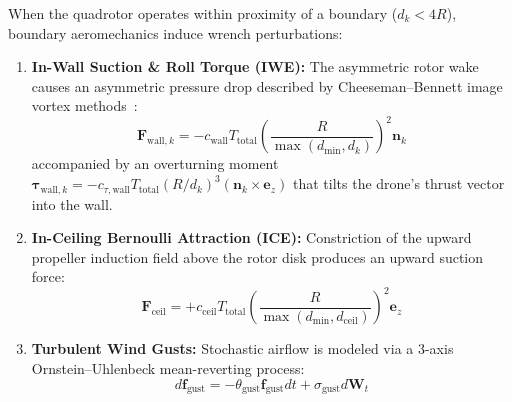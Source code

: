 \documentclass[11pt,a4paper]{article}
\begin{document}
When the quadrotor operates within proximity of a boundary ($d_k < 4R$), boundary aeromechanics induce wrench perturbations:
\begin{enumerate}[leftmargin=14pt, itemsep=2pt]
    \item \textbf{In-Wall Suction \& Roll Torque (IWE):} The asymmetric rotor wake causes an asymmetric pressure drop described by Cheeseman--Bennett image vortex methods~\cite{cheeseman1955effect, kanellakis2018towards}:
    \begin{equation}
    \mathbf{F}_{\text{wall}, k} = -c_{\text{wall}} T_{\text{total}} \left(\frac{R}{\max(d_{\text{min}}, d_k)}\right)^2 \mathbf{n}_k
    \label{eq:f_wall}
    \end{equation}
    accompanied by an overturning moment $\boldsymbol{\tau}_{\text{wall}, k} = -c_{\tau, \text{wall}} T_{\text{total}} (R/d_k)^3 (\mathbf{n}_k \times \mathbf{e}_z)$ that tilts the drone's thrust vector into the wall.
    \item \textbf{In-Ceiling Bernoulli Attraction (ICE):} Constriction of the upward propeller induction field above the rotor disk produces an upward suction force:
    \begin{equation}
    \mathbf{F}_{\text{ceil}} = +c_{\text{ceil}} T_{\text{total}} \left(\frac{R}{\max(d_{\text{min}}, d_{\text{ceil}})}\right)^2 \mathbf{e}_z
    \label{eq:f_ceil}
    \end{equation}
    \item \textbf{Turbulent Wind Gusts:} Stochastic airflow is modeled via a 3-axis Ornstein--Uhlenbeck mean-reverting process:
    \begin{equation}
    d\mathbf{f}_{\text{gust}} = -\theta_{\text{gust}} \mathbf{f}_{\text{gust}} dt + \sigma_{\text{gust}} d\mathbf{W}_t
    \label{eq:ou_gust}
    \end{equation}
\end{enumerate}
\end{document}
